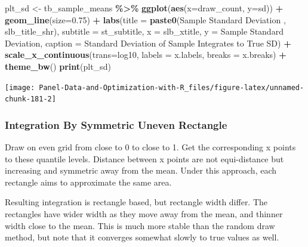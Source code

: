 \documentclass[
]{book}
\newenvironment{Shaded}{\begin{snugshade}}{\end{snugshade}}
\newcommand{\DataTypeTok}[1]{\textcolor[rgb]{0.13,0.29,0.53}{#1}}
\newcommand{\FloatTok}[1]{\textcolor[rgb]{0.00,0.00,0.81}{#1}}
\newcommand{\KeywordTok}[1]{\textcolor[rgb]{0.13,0.29,0.53}{\textbf{#1}}}
\newcommand{\NormalTok}[1]{#1}
\newcommand{\OperatorTok}[1]{\textcolor[rgb]{0.81,0.36,0.00}{\textbf{#1}}}
\newcommand{\StringTok}[1]{\textcolor[rgb]{0.31,0.60,0.02}{#1}}
\begin{document}
\begin{Shaded}
\begin{Highlighting}[]
\NormalTok{plt\_sd \textless{}{-}}\StringTok{ }\NormalTok{tb\_sample\_means }\OperatorTok{\%\textgreater{}\%}
\StringTok{  }\KeywordTok{ggplot}\NormalTok{(}\KeywordTok{aes}\NormalTok{(}\DataTypeTok{x=}\NormalTok{draw\_count, }\DataTypeTok{y=}\NormalTok{sd)) }\OperatorTok{+}
\StringTok{  }\KeywordTok{geom\_line}\NormalTok{(}\DataTypeTok{size=}\FloatTok{0.75}\NormalTok{) }\OperatorTok{+}
\StringTok{  }\KeywordTok{labs}\NormalTok{(}\DataTypeTok{title =} \KeywordTok{paste0}\NormalTok{(}\StringTok{\textquotesingle{}Sample Standard Deviation \textquotesingle{}}\NormalTok{, slb\_title\_shr),}
       \DataTypeTok{subtitle =}\NormalTok{ st\_subtitle,}
       \DataTypeTok{x =}\NormalTok{ slb\_xtitle,}
       \DataTypeTok{y =} \StringTok{\textquotesingle{}Sample Standard Deviation\textquotesingle{}}\NormalTok{,}
       \DataTypeTok{caption =} \StringTok{\textquotesingle{}Standard Deviation of Sample Integrates to True SD\textquotesingle{}}\NormalTok{) }\OperatorTok{+}
\StringTok{  }\KeywordTok{scale\_x\_continuous}\NormalTok{(}\DataTypeTok{trans=}\StringTok{\textquotesingle{}log10\textquotesingle{}}\NormalTok{, }\DataTypeTok{labels =}\NormalTok{ x.labels, }\DataTypeTok{breaks =}\NormalTok{ x.breaks) }\OperatorTok{+}
\StringTok{  }\KeywordTok{theme\_bw}\NormalTok{()}
\KeywordTok{print}\NormalTok{(plt\_sd)}
\end{Highlighting}
\end{Shaded}

\begin{center}\texttt{[image: Panel-Data-and-Optimization-with-R\_files/figure-latex/unnamed-chunk-181-2]} \end{center}

\hypertarget{integration-by-symmetric-uneven-rectangle}{%
\subsubsection{Integration By Symmetric Uneven Rectangle}\label{integration-by-symmetric-uneven-rectangle}}

Draw on even grid from close to 0 to close to 1. Get the corresponding x points to these quantile levels. Distance between x points are not equi-distance but increasing and symmetric away from the mean. Under this approach, each rectangle aims to approximate the same area.

Resulting integration is rectangle based, but rectangle width differ. The rectangles have wider width as they move away from the mean, and thinner width close to the mean. This is much more stable than the random draw method, but note that it converges somewhat slowly to true values as well.
\end{document}
